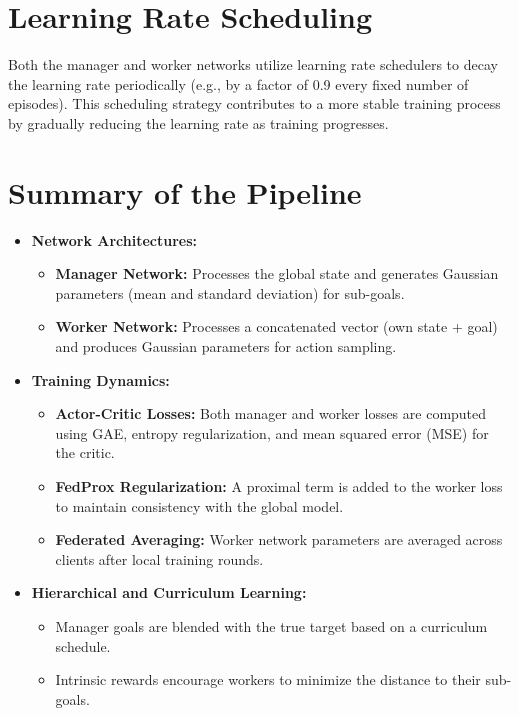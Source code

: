 \documentclass{article}
\begin{document}
\section{Learning Rate Scheduling}
Both the manager and worker networks utilize learning rate schedulers to decay the learning rate periodically (e.g., by a factor of 0.9 every fixed number of episodes). This scheduling strategy contributes to a more stable training process by gradually reducing the learning rate as training progresses.


\section{Summary of the Pipeline}
\begin{itemize}
    \item \textbf{Network Architectures:}
    \begin{itemize}
        \item \textbf{Manager Network:} Processes the global state and generates Gaussian parameters (mean and standard deviation) for sub-goals.
        \item \textbf{Worker Network:} Processes a concatenated vector (own state + goal) and produces Gaussian parameters for action sampling.
    \end{itemize}
    \item \textbf{Training Dynamics:}
    \begin{itemize}
        \item \textbf{Actor-Critic Losses:} Both manager and worker losses are computed using GAE, entropy regularization, and mean squared error (MSE) for the critic.
        \item \textbf{FedProx Regularization:} A proximal term is added to the worker loss to maintain consistency with the global model.
        \item \textbf{Federated Averaging:} Worker network parameters are averaged across clients after local training rounds.
    \end{itemize}
    \item \textbf{Hierarchical and Curriculum Learning:}
    \begin{itemize}
        \item Manager goals are blended with the true target based on a curriculum schedule.
        \item Intrinsic rewards encourage workers to minimize the distance to their sub-goals.
    \end{itemize}
\end{itemize}
\end{document}
